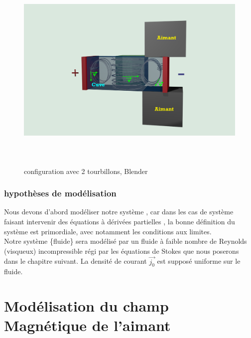 \documentclass[a4paper,12pt,titlepage]{report}
\begin{document}
\begin{onehalfspace}
\begin{figure}[!h]
	\begin{center}
	\centering
		\includegraphics[height = 10cm, keepaspectratio]{graphes/blender_cuve_champvec3.png} 
		\caption{configuration avec 2 tourbillons, Blender}
	\end{center}
\end{figure}
\newpage

\subsection{hypothèses de modélisation}
Nous devons d'abord modéliser notre système , car dans les cas de système faisant intervenir des équations à dérivées partielles , la bonne définition du système est primordiale, avec notamment les conditions aux limites.\\
Notre système \{fluide\} sera modélisé par un fluide à faible nombre de Reynolds (visqueux) incompressible régi par les équations de Stokes que nous poserons dans le chapitre suivant. La densité de courant $\vec{j_0}$ est supposé uniforme sur le fluide.


\newpage
\chapter{Modélisation du champ Magnétique de l'aimant}


\end{onehalfspace}
\end{document}
